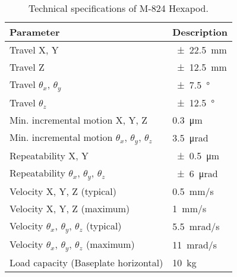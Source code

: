 \begin{table}[h]
    \centering
    \footnotesize
    \renewcommand{\arraystretch}{1.2}
    \begin{tabular}{p{7cm}p{3cm}}
        \toprule
        \textbf{Parameter} & \textbf{Description} \\
        \midrule
        Travel X, Y & \SI{\pm22.5}{\milli\meter} \\        
        Travel Z & \SI{\pm12.5}{\milli\meter} \\        
        Travel $\theta_x$, $\theta_y$ & \SI{\pm7.5}{\degree} \\        
        Travel $\theta_z$ & \SI{\pm12.5}{\degree} \\        
        Min. incremental motion X, Y, Z & \SI{0.3}{\micro\meter} \\
        Min. incremental motion $\theta_x$, $\theta_y$, $\theta_z$ & \SI{3.5}{\micro\radian} \\
        Repeatability X, Y & \SI{\pm0.5}{\micro\meter} \\
        Repeatability $\theta_x$, $\theta_y$, $\theta_z$ & \SI{\pm6}{\micro\radian} \\
        Velocity X, Y, Z (typical) & \SI{0.5}{\milli\meter/\second} \\
        Velocity X, Y, Z (maximum) & \SI{1}{\milli\meter/\second} \\
        Velocity $\theta_x$, $\theta_y$, $\theta_z$ (typical) & \SI{5.5}{\milli\radian/\second} \\
        Velocity $\theta_x$, $\theta_y$, $\theta_z$ (maximum) & \SI{11}{\milli\radian/\second} \\
        Load capacity (Baseplate horizontal) & \SI{10}{\kilo\gram} \\
        \bottomrule
    \end{tabular}
    \caption{Technical specifications of M-824 Hexapod. \cite{hexapod_manual}}
    \label{table:technical_specifications_hexapod}
\end{table}